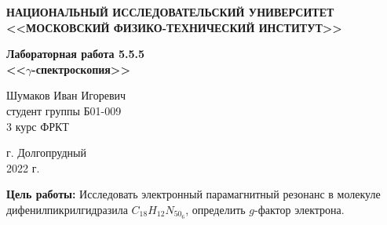 \documentclass[a4paper,12pt]{article} %
\begin{document}
	
	
	\begin{center}
		
		\textbf{НАЦИОНАЛЬНЫЙ ИССЛЕДОВАТЕЛЬСКИЙ УНИВЕРСИТЕТ \\ <<МОСКОВСКИЙ ФИЗИКО-ТЕХНИЧЕСКИЙ ИНСТИТУТ>>}
		\vspace{13ex}
		
		\textbf{Лабораторная работа 5.5.5\\ <<$\gamma$-спектроскопия>>}
		\vspace{40ex}
		
		\normalsize{Шумаков Иван Игоревич \\ студент группы Б01-009\\ 3 курс ФРКТ\\}
	\end{center}
	
	\vfill 
	
	\begin{center}
		г. Долгопрудный\\ 
		2022 г.
	\end{center}
	
	
	\thispagestyle{empty} %
	\newpage

	\textbf{Цель работы:} Исследовать электронный парамагнитный резонанс в молекуле дифенилпикрилгидразила $C_{18}H_{12}N_50_6$, определить $g$-фактор электрона. 
\end{document}
